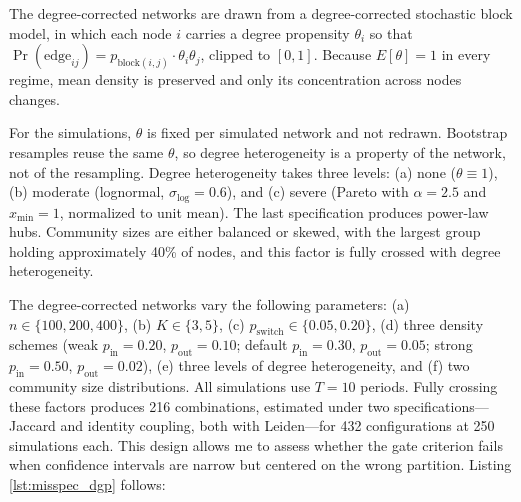\documentclass[11pt, letterpaper]{article}
\numberwithin{equation}{section}
\begin{document}
The degree-corrected networks are drawn from a degree-corrected stochastic block model, in which each node $i$ carries a degree propensity $\theta_i$ so that $\Pr(\mathrm{edge}_{ij}) = p_{\mathrm{block}(i,j)} \cdot \theta_i \theta_j$, clipped to $[0,1]$. Because $E[\theta] = 1$ in every regime, mean density is preserved and only its concentration across nodes changes.

For the simulations, $\theta$ is fixed per simulated network and not redrawn. Bootstrap resamples reuse the same $\theta$, so degree heterogeneity is a property of the network, not of the resampling. Degree heterogeneity takes three levels: (a) none ($\theta \equiv 1$), (b) moderate (lognormal, $\sigma_{\log} = 0.6$), and (c) severe (Pareto with $\alpha = 2.5$ and $x_{\min} = 1$, normalized to unit mean). The last specification produces power-law hubs. Community sizes are either balanced or skewed, with the largest group holding approximately 40\% of nodes, and this factor is fully crossed with degree heterogeneity.

The degree-corrected networks vary the following parameters: (a) $n \in \{100, 200, 400\}$, (b) $K \in \{3, 5\}$, (c) $p_{\mathrm{switch}} \in \{0.05, 0.20\}$, (d) three density schemes (weak $p_{\mathrm{in}} = 0.20$, $p_{\mathrm{out}} = 0.10$; default $p_{\mathrm{in}} = 0.30$, $p_{\mathrm{out}} = 0.05$; strong $p_{\mathrm{in}} = 0.50$, $p_{\mathrm{out}} = 0.02$), (e) three levels of degree heterogeneity, and (f) two community size distributions. All simulations use $T = 10$ periods. Fully crossing these factors produces 216 combinations, estimated under two specifications---Jaccard and identity coupling, both with Leiden---for 432 configurations at 250 simulations each. This design allows me to assess whether the gate criterion fails when confidence intervals are narrow but centered on the wrong partition. Listing \ref{lst:misspec_dgp} follows:
\end{document}
